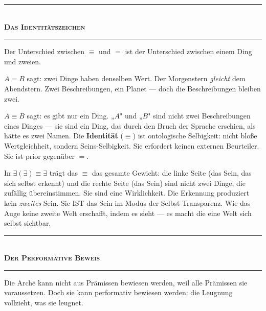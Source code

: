 \documentclass[10pt, openany, oneside]{book}
\renewcommand{\normalsize}{\fontsize{10}{13}\selectfont}
\begin{document}
\begin{center}
    \rule{0.3\textwidth}{0.4pt}\\[0.5em]
    {\normalsize\bfseries\scshape Das Identitätszeichen}\\[0.3em]
    \rule{0.3\textwidth}{0.4pt}
\end{center}

\vspace{1em}

\noindent Der Unterschied zwischen $\equiv$ und $=$ ist der Unterschied zwischen einem Ding und zweien.

$A = B$ sagt: zwei Dinge haben denselben Wert. Der Morgenstern \textit{gleicht} dem Abendstern. Zwei Beschreibungen, ein Planet --- doch die Beschreibungen bleiben zwei.

$A \equiv B$ sagt: es gibt nur ein Ding. „$A$" und „$B$" sind nicht zwei Beschreibungen eines Dinges --- sie sind ein Ding, das durch den Bruch der Sprache erschien, als hätte es zwei Namen. Die \textbf{Identität} ($\equiv$) ist ontologische Selbigkeit: nicht bloße Wertgleichheit, sondern Seins-Selbigkeit. Sie erfordert keinen externen Beurteiler. Sie ist prior gegenüber $=$.

In $\exists(\exists) \equiv \exists$ trägt das $\equiv$ das gesamte Gewicht: die linke Seite (das Sein, das sich selbst erkennt) und die rechte Seite (das Sein) sind nicht zwei Dinge, die zufällig übereinstimmen. Sie sind eine Wirklichkeit. Die Erkennung produziert kein \textit{zweites} Sein. Sie IST das Sein im Modus der Selbst-Transparenz. Wie das Auge keine zweite Welt erschafft, indem es sieht --- es macht die eine Welt sich selbst sichtbar.

\vspace{1.5em}


\begin{center}
    \rule{0.3\textwidth}{0.4pt}\\[0.5em]
    {\normalsize\bfseries\scshape Der Performative Beweis}\\[0.3em]
    \rule{0.3\textwidth}{0.4pt}
\end{center}

\vspace{1em}

\noindent Die Arch\={e} kann nicht aus Prämissen bewiesen werden, weil alle Prämissen sie voraussetzen. Doch sie kann performativ bewiesen werden: die Leugnung vollzieht, was sie leugnet.
\end{document}
